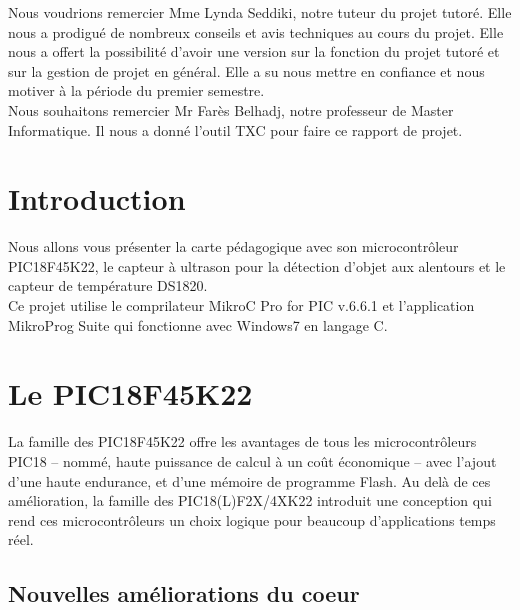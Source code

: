 \documentclass[a4paper, 12pt]{book}
\newcounter{program}[subsection]
\begin{document}
Nous voudrions remercier Mme Lynda Seddiki, notre tuteur du projet tutoré. Elle nous a prodigué de nombreux conseils et avis techniques au cours du projet. Elle nous a offert la possibilité d’avoir une version sur la fonction du projet tutoré et sur la gestion de projet en général. Elle a su nous mettre en confiance et nous motiver à la période du premier semestre.\\

Nous souhaitons remercier Mr Farès Belhadj, notre professeur de Master Informatique. Il nous a donné l’outil TXC pour faire ce rapport de projet.


\chapter{Introduction}
Nous allons vous présenter la carte pédagogique avec son microcontrôleur PIC18F45K22, le capteur à ultrason pour la détection d'objet aux alentours et le capteur de température DS1820.\\

Ce projet utilise le comprilateur MikroC Pro for PIC v.6.6.1 et l'application MikroProg Suite qui fonctionne avec Windows7 en langage C. \\

\chapter{Le PIC18F45K22}
La famille des PIC18F45K22 offre les avantages de tous les microcontrôleurs  PIC18 – nommé, haute puissance de calcul à un coût économique – avec l’ajout d’une haute endurance, et d’une mémoire de programme Flash. Au delà de ces amélioration, la famille des PIC18(L)F2X/4XK22 introduit une conception qui rend ces microcontrôleurs un choix logique pour beaucoup d’applications temps réel.\\

\section{Nouvelles améliorations du coeur}
\end{document}
